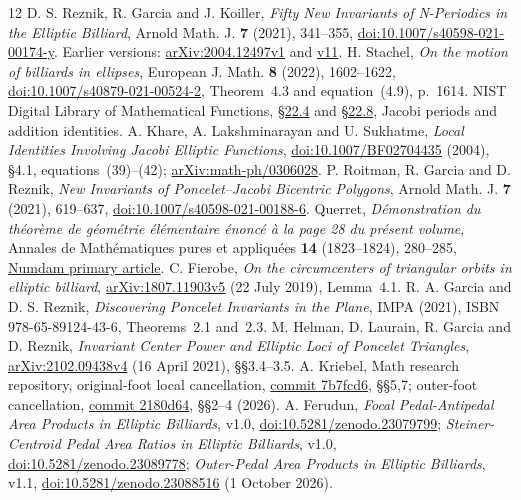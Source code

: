 \documentclass[11pt]{article}
\begin{document}
\begin{thebibliography}{12}
 D. S. Reznik, R. Garcia and J. Koiller,
\emph{Fifty New Invariants of N-Periodics in the Elliptic Billiard},
Arnold Math. J. \textbf{7} (2021), 341--355,
\href{https://doi.org/10.1007/s40598-021-00174-y}{doi:10.1007/s40598-021-00174-y}.
Earlier versions: \href{https://arxiv.org/abs/2004.12497v1}{arXiv:2004.12497v1}
and \href{https://arxiv.org/abs/2004.12497v11}{v11}.
 H. Stachel,
\emph{On the motion of billiards in ellipses},
European J. Math. \textbf{8} (2022), 1602--1622,
\href{https://doi.org/10.1007/s40879-021-00524-2}{doi:10.1007/s40879-021-00524-2},
Theorem~4.3 and equation~(4.9), p.~1614.
 NIST Digital Library of Mathematical Functions,
\href{https://dlmf.nist.gov/22.4}{\S22.4} and
\href{https://dlmf.nist.gov/22.8}{\S22.8}, Jacobi periods and addition identities.
 A. Khare, A. Lakshminarayan and U. Sukhatme,
\emph{Local Identities Involving Jacobi Elliptic Functions},
\href{https://doi.org/10.1007/BF02704435}{doi:10.1007/BF02704435} (2004),
\S4.1, equations~(39)--(42);
\href{https://arxiv.org/abs/math-ph/0306028}{arXiv:math-ph/0306028}.
 P. Roitman, R. Garcia and D. Reznik,
\emph{New Invariants of Poncelet--Jacobi Bicentric Polygons},
Arnold Math. J. \textbf{7} (2021), 619--637,
\href{https://doi.org/10.1007/s40598-021-00188-6}{doi:10.1007/s40598-021-00188-6}.
 Querret,
\emph{D\'emonstration du th\'eor\`eme de g\'eom\'etrie \'el\'ementaire
\'enonc\'e \`a la page 28 du pr\'esent volume},
Annales de Math\'ematiques pures et appliqu\'ees \textbf{14}
(1823--1824), 280--285,
\href{https://www.numdam.org/item/AMPA_1823-1824__14__280_0/}{Numdam primary article}.
 C. Fierobe,
\emph{On the circumcenters of triangular orbits in elliptic billiard},
\href{https://arxiv.org/abs/1807.11903v5}{arXiv:1807.11903v5} (22 July 2019), Lemma~4.1.
 R. A. Garcia and D. S. Reznik,
\emph{Discovering Poncelet Invariants in the Plane}, IMPA (2021),
ISBN 978-65-89124-43-6, Theorems~2.1 and~2.3.
 M. Helman, D. Laurain, R. Garcia and D. Reznik,
\emph{Invariant Center Power and Elliptic Loci of Poncelet Triangles},
\href{https://arxiv.org/abs/2102.09438v4}{arXiv:2102.09438v4} (16 April 2021), \S\S3.4--3.5.
 A. Kriebel, Math research repository,
original-foot local cancellation,
\href{https://github.com/AlecKriebel/Math/blob/7b7fcd63d5ea83df3a4c29853c4ba34b93d16f07/unsolved_math_prioritization/attempts/5100021/PROOF.md}{commit 7b7fcd6}, \S\S5,7;
outer-foot cancellation,
\href{https://github.com/AlecKriebel/Math/blob/2180d64b648b81ac660a792f7823d0b715f9cf12/unsolved_math_prioritization/attempts/5100033/PROOF.md}{commit 2180d64}, \S\S2--4 (2026).
 A. Ferudun,
\emph{Focal Pedal-Antipedal Area Products in Elliptic Billiards}, v1.0,
\href{https://doi.org/10.5281/zenodo.23079799}{doi:10.5281/zenodo.23079799};
\emph{Steiner-Centroid Pedal Area Ratios in Elliptic Billiards}, v1.0,
\href{https://doi.org/10.5281/zenodo.23089778}{doi:10.5281/zenodo.23089778};
\emph{Outer-Pedal Area Products in Elliptic Billiards}, v1.1,
\href{https://doi.org/10.5281/zenodo.23088516}{doi:10.5281/zenodo.23088516}
(1 October 2026).
\end{thebibliography}
\end{document}
